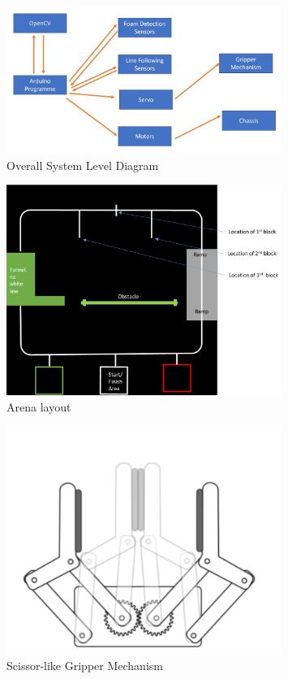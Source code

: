 \documentclass{article}
\begin{document}
\begin{figure}[!h]
    \centering
    \includegraphics[width=0.8\textwidth]{assets/Overall_sys.jpg}
    \caption{Overall System Level Diagram}
    \label{fig:overall_sys}
\end{figure}

\begin{figure}[!h]
    \centering
    \includegraphics[width=0.8\textwidth]{assets/arena.png}
    \caption{Arena layout}
    \label{fig:arena}
\end{figure}

\begin{figure}[!h]
    \centering
    \includegraphics[width=0.8\textwidth]{assets/Gripper_Mechanism.jpg}
    \caption{Scissor-like Gripper Mechanism}
    \label{fig:grip_mech}
\end{figure}
\end{document}
